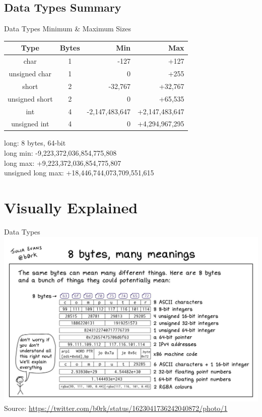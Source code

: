 \documentclass{beamer}
\begin{document}
\subsection{Data Types Summary}
\begin{frame}{Data Types Minimum \& Maximum Sizes}
\begin{table}[]
\begin{tabular}{c c r r}
Type & Bytes & Min & Max \\
\hline
char & 1 & -127 & +127 \\
unsigned char & 1 & 0 & +255 \\
short & 2 & -32,767 & +32,767   \\
unsigned short & 2 & 0 & +65,535 \\
int & 4 & -2,147,483,647 & +2,147,483,647 \\
unsigned int & 4 & 0 & +4,294,967,295
\end{tabular}
\end{table}
long: 8 bytes, 64-bit \\
long min: -9,223,372,036,854,775,808 \\
long max: +9,223,372,036,854,775,807 \\
unsigned long max: +18,446,744,073,709,551,615
\end{frame}

\section{Visually Explained}
\begin{frame}{Data Types}
\includegraphics[scale=0.256]{DataTypesMeme.jpeg}
\footnotesize Source: \url{https://twitter.com/b0rk/status/1623041736242040872/photo/1}
\end{frame}
\end{document}

